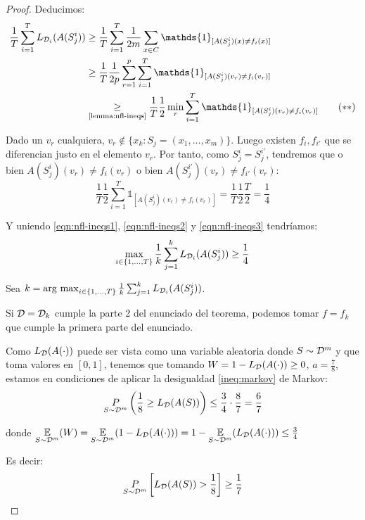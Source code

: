 \begin{proof}
Deducimos:
\begin{align}
\frac{1}{T} \sum_{i=1}^{T}  L_{\dist_i} (A(S_j^i)) &\ge
\frac{1}{T} \sum_{i=1}^{T}  \frac{1}{2m} \sum_{x \in C} \mathds{1}_{[A(S^i_j)(x) \neq f_i(x)]}\nonumber\\
&\ge \frac{1}{T} \frac{1}{2p} \sum_{r=1}^p \sum_{i=1}^{T}  \mathds{1}_{[A(S^i_j)(v_r) \neq f_i(v_r)]} \nonumber\\
&\underset{\textrm{\ref{lemma:nfl-ineqs}}}{\ge} \frac{1}{T} \frac{1}{2} \min_{r} \sum_{i=1}^{T}  \mathds{1}_{[A(S^i_j)(v_r) \neq f_i(v_r)]} 
\label{eqn:nfl-ineqs2}\tag{$\ast$$\ast$}
\end{align}


Dado un $v_r$ cualquiera, $v_r \notin \bigg\{x_k: S_j = (x_1, \ldots, x_m)\bigg\}$. Luego existen 
$f_i, f_{i'}$ que se diferencian justo en el elemento $v_r$. Por tanto, como $S_j^i = S_j^{i'}$,
tendremos que o bien $A(S^i_j)(v_r) \neq f_i(v_r)$ o bien $A(S^{i'}_j)(v_r) \neq f_{i'}(v_r)$:
\begin{equation}
\frac{1}{T} \frac{1}{2} \sum_{i=1}^{T}  \mathds{1}_{[A(S^i_j)(v_r) \neq f_i(v_r)]} = 
  \frac{1}{T} \frac{1}{2} \frac{T}{2} = \frac{1}{4}
\label{eqn:nfl-ineqs3}\tag{$\ast$$\ast$$\ast$}
\end{equation}

Y uniendo \eqref{eqn:nfl-ineqs1}, \eqref{eqn:nfl-ineqs2} y \eqref{eqn:nfl-ineqs3} tendríamos:
\[
  \max_{i \in \{1,\ldots, T\}} \frac{1}{k} \sum_{j=1}^{k} L_{\mathcal{D}_i} (A(S_j^i)) \ge \frac{1}{4}
\]

Sea $k = \operatorname*{arg\,\max}_{i \in \{1,\ldots, T\}} \frac{1}{k} \sum_{j=1}^{k} L_{\mathcal{D}_i} (A(S_j^i))$.

Si $\mathcal{D} = \mathcal{D}_k$ cumple la parte 2 del enunciado del teorema, podemos tomar $f=f_k$ que cumple la primera
parte del enunciado.

Como $L_{\mathcal{D}} (A(\cdot))$ puede ser vista como una variable aleatoria donde $S \sim \mathcal{D}^m$ y que toma
valores en $[0,1]$, tenemos que tomando $W = 1-L_{\mathcal{D}}(A(\cdot))\ge 0$, $a=\frac{7}{8}$, estamos en 
condiciones de aplicar la desigualdad \ref{ineq:markov} de Markov:
\[
  \underset{S\sim \mathcal{D}^m}{P} \left(\frac{1}{8} \ge L_{\mathcal{D}}(A(S)) \right) \le \frac{3}{4} \cdot \frac{8}{7} = \frac{6}{7}
\]

donde $\underset{S\sim \mathcal{D}^m}{\mathbb{E}}(W) = \underset{S\sim \mathcal{D}^m}{\mathbb{E}} (1 - L_{\mathcal{D}}(A(\cdot))) = 1 - \underset{S\sim \mathcal{D}^m}{\mathbb{E}} (L_{\mathcal{D}}(A(\cdot))) \le \frac{3}{4}$

Es decir:
\[
  \underset{S\sim \mathcal{D}^m}{P} \left[ L_{\mathcal{D}}(A(S)) > \frac{1}{8} \right] \ge \frac{1}{7}
\]
\end{proof}

